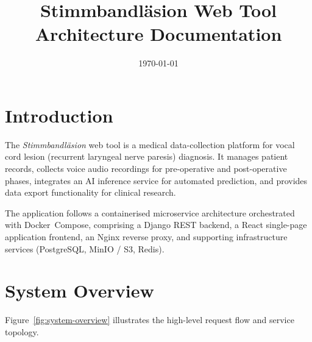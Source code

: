 \documentclass[12pt,a4paper]{article}
\title{%
  \textbf{Stimmbandl\"asion Web Tool}\\[0.4em]
  \Large Architecture Documentation
}
\author{}
\date{\today}
\begin{document}
\maketitle
\tableofcontents
\newpage

\section{Introduction}
\label{sec:introduction}

The \emph{Stimmbandl\"asion} web tool is a medical data-collection platform for
vocal cord lesion (recurrent laryngeal nerve paresis) diagnosis. It manages
patient records, collects voice audio recordings for pre-operative and
post-operative phases, integrates an AI inference service for automated
prediction, and provides data export functionality for clinical research.

The application follows a containerised microservice architecture orchestrated
with Docker~Compose, comprising a Django REST back\-end, a React single-page
application front\-end, an Nginx reverse proxy, and supporting infrastructure
services (PostgreSQL, MinIO / S3, Redis).

\section{System Overview}
\label{sec:overview}

Figure~\ref{fig:system-overview} illustrates the high-level request flow and
service topology.
\end{document}
